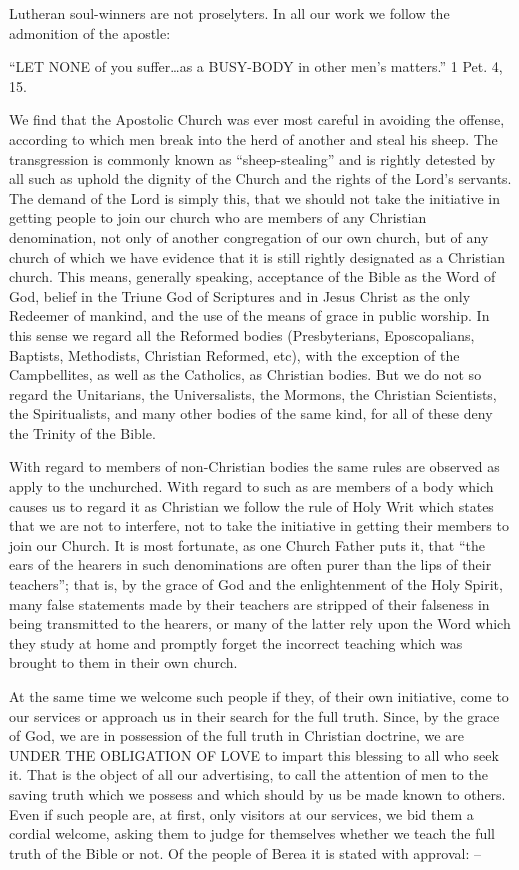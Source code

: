 \documentclass[
]{book}
\begin{document}
Lutheran soul-winners are not proselyters. In all our work we follow the admonition of the apostle:

``LET NONE of you suffer\ldots as a BUSY-BODY in other men's matters.'' 1 Pet. 4, 15.

We find that the Apostolic Church was ever most careful in avoiding the offense, according to which men break into the herd of another and steal his sheep. The transgression is commonly known as ``sheep-stealing'' and is rightly detested by all such as uphold the dignity of the Church and the rights of the Lord's servants. The demand of the Lord is simply this, that we should not take the initiative in getting people to join our church who are members of any Christian denomination, not only of another congregation of our own church, but of any church of which we have evidence that it is still rightly designated as a Christian church. This means, generally speaking, acceptance of the Bible as the Word of God, belief in the Triune God of Scriptures and in Jesus Christ as the only Redeemer of mankind, and the use of the means of grace in public worship. In this sense we regard all the Reformed bodies (Presbyterians, Eposcopalians, Baptists, Methodists, Christian Reformed, etc), with the exception of the Campbellites, as well as the Catholics, as Christian bodies. But we do not so regard the Unitarians, the Universalists, the Mormons, the Christian Scientists, the Spiritualists, and many other bodies of the same kind, for all of these deny the Trinity of the Bible.

With regard to members of non-Christian bodies the same rules are observed as apply to the unchurched. With regard to such as are members of a body which causes us to regard it as Christian we follow the rule of Holy Writ which states that we are not to interfere, not to take the initiative in getting their members to join our Church. It is most fortunate, as one Church Father puts it, that ``the ears of the hearers in such denominations are often purer than the lips of their teachers''; that is, by the grace of God and the enlightenment of the Holy Spirit, many false statements made by their teachers are stripped of their falseness in being transmitted to the hearers, or many of the latter rely upon the Word which they study at home and promptly forget the incorrect teaching which was brought to them in their own church.

At the same time we welcome such people if they, of their own initiative, come to our services or approach us in their search for the full truth. Since, by the grace of God, we are in possession of the full truth in Christian doctrine, we are UNDER THE OBLIGATION OF LOVE to impart this blessing to all who seek it. That is the object of all our advertising, to call the attention of men to the saving truth which we possess and which should by us be made known to others. Even if such people are, at first, only visitors at our services, we bid them a cordial welcome, asking them to judge for themselves whether we teach the full truth of the Bible or not. Of the people of Berea it is stated with approval: --
\end{document}
